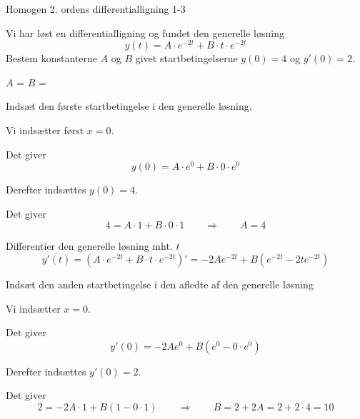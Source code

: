 \documentclass{article}
\begin{document}
\begin{exercise}{Homogen 2. ordens differentialligning 1-3}
	
Vi har løst en differentialligning og fundet den generelle løsning
\[
y(t) = A \cdot e^{-2t} + B \cdot t \cdot e^{-2t}
\]
Bestem konstanterne $A$ og $B$ givet startbetingelserne $y(0)=4$ og $y'(0)=2$.


$A$ = 		
$B$ = 

\hint

Indsæt den første startbetingelse i den generelle løsning. 


\hint

Vi indsætter først $x=0$.

\hint

Det giver
\[
y(0)=  A \cdot e^{0} + B \cdot 0 \cdot e^{0}
\]

\hint

Derefter indsættes $y(0)=4$.

\hint 

Det giver 
\[
4 = A \cdot 1 + B \cdot 0 \cdot 1 \qquad \Rightarrow \qquad A = 4
\]

\hint 

Differentier den generelle løsning mht. $t$
\[
y'(t)= \left(A \cdot e^{-2t} + B \cdot t \cdot e^{-2t} \right)' = -2A e^{-2t} + B \left( e^{-2t} -2 t e^{-2t} \right)
\]

\hint 

Indsæt den anden startbetingelse i den afledte af den generelle løsning

\hint

Vi indsætter $x=0$.

\hint 

Det giver
\[
y'(0) = -2A e^{0} + B \left( e^{0} - 0 \cdot e^{0} \right)
\]

\hint 

Derefter indsættes $y'(0)=2$.

\hint

Det giver
\[
2 = -2A \cdot 1 + B \left(1- 0 \cdot 1 \right) \qquad \Rightarrow \qquad B = 2 + 2A = 2 + 2 \cdot 4 = 10
\]

	
\end{exercise}

\newpage
\end{document}

